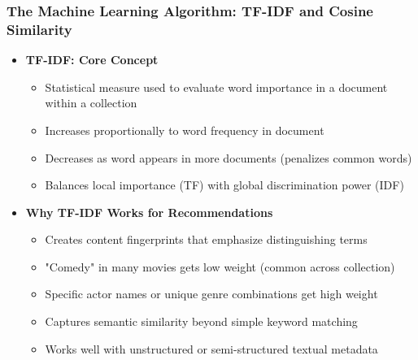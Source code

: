 \documentclass{beamer}
\begin{document}
\begin{frame}
\frametitle{The Machine Learning Algorithm: TF-IDF and Cosine Similarity}

\begin{itemize}
    \item \textbf{TF-IDF: Core Concept}
    \begin{itemize}
        \item Statistical measure used to evaluate word importance in a document within a collection
        \item Increases proportionally to word frequency in document
        \item Decreases as word appears in more documents (penalizes common words)
        \item Balances local importance (TF) with global discrimination power (IDF)
    \end{itemize}
    
    \vspace{0.5cm}
    
    \item \textbf{Why TF-IDF Works for Recommendations}
    \begin{itemize}
        \item Creates content fingerprints that emphasize distinguishing terms
        \item "Comedy" in many movies gets low weight (common across collection)
        \item Specific actor names or unique genre combinations get high weight
        \item Captures semantic similarity beyond simple keyword matching
        \item Works well with unstructured or semi-structured textual metadata
    \end{itemize}
\end{itemize}
\end{frame}
\end{document}
